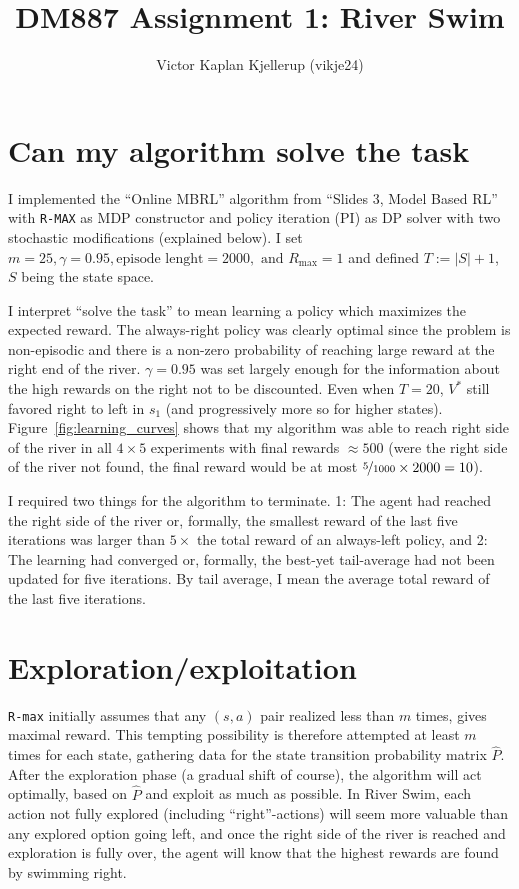 \documentclass{article}
\begin{document}
\title{DM887 Assignment 1: River Swim}
\author{Victor Kaplan Kjellerup (vikje24)}
\date{}  %
\maketitle

\section*{Can my algorithm solve the task}
I implemented the ``Online MBRL'' algorithm from ``Slides 3, Model Based RL'' with \lstinline|R-MAX| as MDP constructor and policy iteration (PI) as DP solver with two stochastic modifications (explained below). I set \(m=25, \gamma=0.95, \text{episode lenght} = 2000, \text{ and } R_\text{max} = 1\) and defined \(T := |S|+1\), \(S\) being the state space.

I interpret ``solve the task'' to mean learning a policy which maximizes the expected reward. The always-right policy was clearly optimal since the problem is non-episodic and there is a non-zero probability of reaching large reward at the right end of the river. \(\gamma=0.95\) was set largely enough for the information about the high rewards on the right not to be discounted. Even when \(T=20\), \(V^*\) still favored right to left in \(s_1\) (and progressively more so for higher states). Figure~\ref{fig:learning_curves} shows that my algorithm was able to reach right side of the river in all \(4 \times 5\) experiments with final rewards \(\approx 500\) (were the right side of the river not found, the final reward would be at most \(\nicefrac{5}{1000} \times 2000 = 10\)).

I required two things for the algorithm to terminate. 1: The agent had reached the right side of the river or, formally, the smallest reward of the last five iterations was larger than \(5\times\) the total reward of an always-left policy, and 2: The learning had converged or, formally, the best-yet tail-average had not been updated for five iterations. By tail average, I mean the average total reward of the last five iterations.

\section*{Exploration/exploitation}
\lstinline|R-max| initially assumes that any \((s,a)\) pair realized less than \(m\) times, gives maximal reward. This tempting possibility is therefore attempted at least \(m\) times for each state, gathering data for the state transition probability matrix \(\hat{P}\). After the exploration phase (a gradual shift of course), the algorithm will act optimally, based on \(\hat{P}\) and exploit as much as possible. In River Swim, each action not fully explored (including ``right''-actions) will seem more valuable than any explored option going left, and once the right side of the river is reached and exploration is fully over, the agent will know that the highest rewards are found by swimming right.
\end{document}
